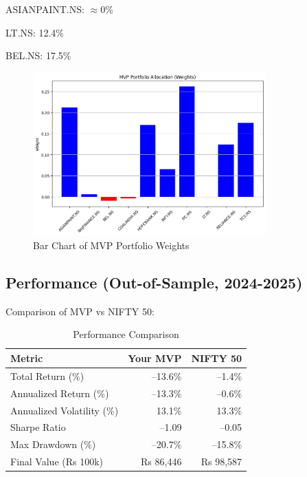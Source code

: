 \documentclass[12pt]{article}
\begin{document}
ASIANPAINT.NS: $\approx$0\%

LT.NS: 12.4\%

BEL.NS: 17.5\%

\begin{figure}[H]
    \centering
    \includegraphics[width=0.8\textwidth]{3.png}
    \caption{Bar Chart of MVP Portfolio Weights}
    \label{fig:weights}
\end{figure}

\subsection{Performance (Out-of-Sample, 2024-2025)}

Comparison of MVP vs NIFTY 50:

\begin{table}[H]
    \centering
    \begin{tabular}{lrr}
        \toprule
        Metric & Your MVP & NIFTY 50 \\
        \midrule
        Total Return (\%) & –13.6\% & –1.4\% \\
        Annualized Return (\%) & –13.3\% & –0.6\% \\
        Annualized Volatility (\%) & 13.1\% & 13.3\% \\
        Sharpe Ratio & –1.09 & –0.05 \\
        Max Drawdown (\%) & –20.7\% & –15.8\% \\
        Final Value (Rs 100k) & Rs 86,446 & Rs 98,587 \\
        \bottomrule
    \end{tabular}
    \caption{Performance Comparison}
    \label{tab:performance}
\end{table}
\end{document}

